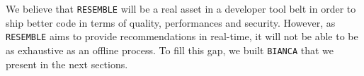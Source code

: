 We believe that {\tt RESEMBLE} will be a real asset in a developer tool belt in order to ship better code in terms of quality, performances and security. 
However, as {\tt RESEMBLE} aims to provide recommendations in real-time, it will not be able to be as exhaustive as an offline process. 
To fill this gap, we built {\tt BIANCA} that we present in the next sections.